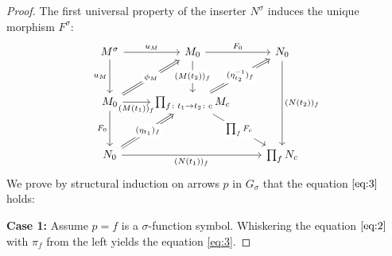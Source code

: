 \documentclass[11pt]{article}
\theoremstyle{plain}
\theoremstyle{definition}
\numberwithin{equation}{section}
\begin{document}
\begin{proof}
   The first universal property of the inserter $N^\sigma$ induces the unique morphism $F^\sigma$:
   $$
   \begin{tikzcd}[row sep = 1 cm]
M^\sigma \arrow[d, "u_M"'] \arrow[r, "u_M"]                                                 & M_0 \arrow[r, "F_0"] \arrow[d, "(M(t_2))_f" description]                                                                              & N_0 \arrow[dd, "(N(t_2))_f"] \\
M_0 \arrow[d, "F_0"'] \arrow[r, "(M(t_1))_f"'] \arrow[ru, "\phi_M" description, Rightarrow] & \prod_{f\colon t_1\to t_2\colon c}M_c \arrow[rd, "\prod_f F_c" description] \arrow[ru, "(\eta_{t_2}^{-1})_f" description, Rightarrow] &                              \\
N_0 \arrow[rr, "(N(t_1))_f"'] \arrow[ru, "(\eta_{t_1})_f" description, Rightarrow]          &                                                                                                                                       & \prod_f N_c                 
\end{tikzcd}
   $$
   We prove by structural induction on arrows $p$ in $G_\sigma$ that the equation $\eqref{eq:3}$ holds:
       
       \noindent\textbf{Case 1:} Assume $p = f$ is a $\sigma$-function symbol. Whiskering the equation $\eqref{eq:2}$ with $\pi_f$ from the left yields the equation \eqref{eq:3}.


\end{proof}
\end{document}
